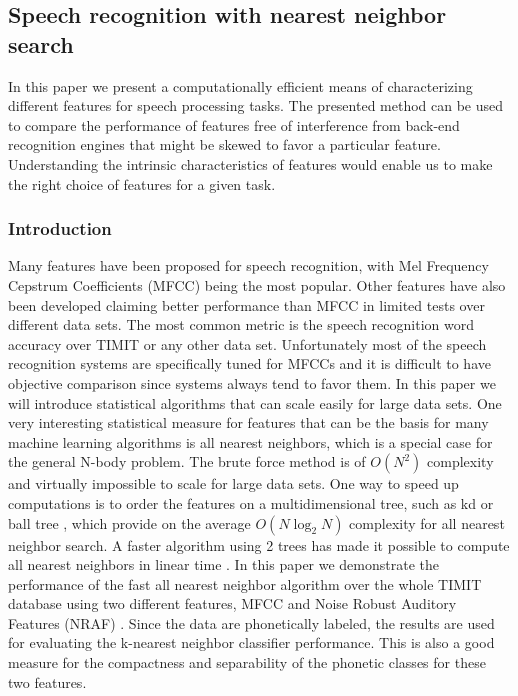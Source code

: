 \documentclass[12pt,letterpaper,doublespaced,ETD,dvips,proposal]{gtthesis}
\begin{document}
\begin{Body}
\subsection{Speech recognition with nearest neighbor search}

In this paper we present a computationally efficient means of
characterizing different features for speech processing tasks. The
presented method can be used to compare the performance of features
free of interference from back-end recognition engines that might be
skewed to favor a particular feature. Understanding the intrinsic
characteristics of features would enable us to make the right choice
of features for a given task.

\subsubsection{Introduction}
Many features have been proposed for speech recognition, with Mel
Frequency Cepstrum Coefficients (MFCC) \cite{quatieri2002dts} being
the most popular. Other features have also been developed claiming
better performance than MFCC in limited tests over different data
sets. The most common metric is the speech recognition word accuracy
over TIMIT or any other data set. Unfortunately most of the speech
recognition systems are specifically tuned for MFCCs and it is
difficult to have objective comparison since systems always tend to
favor them. In this paper we will introduce statistical algorithms
that can scale easily for large data sets. One very interesting
statistical measure for features that can be the basis for many
machine learning algorithms is all nearest neighbors, which is a
special case for the general N-body problem. The brute force method
is of $O(N^2)$  complexity and virtually impossible to scale for
large data sets. One way to speed up computations is to order the
features on a multidimensional tree, such as kd or ball tree
\cite{bentley1975bst}, \cite{moore2000ahu} which provide on the
average $O(N\log_2N)$ complexity for all nearest neighbor search. A
faster algorithm using 2 trees has made it possible to compute all
nearest neighbors in linear time \cite{gray2000nbp}.  In this paper
we demonstrate the performance of the fast all nearest neighbor
algorithm over the whole TIMIT database using two different
features, MFCC and Noise Robust Auditory Features (NRAF)
\cite{ravindran:inr}. Since the data are phonetically labeled, the
results are used for evaluating the k-nearest neighbor classifier
performance. This is also a good measure for the compactness and
separability of the phonetic classes for these two features.


\end{Body}
\end{document}
